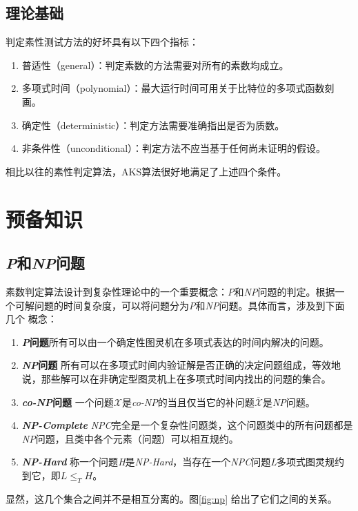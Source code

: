 \documentclass[a4paper]{article}
\numberwithin{equation}{section}
\begin{document}
\begin{multicols}{2}
  \subsection{理论基础}
  判定素性测试方法的好坏具有以下四个指标：
  \begin{enumerate}
  \item 普适性（general）：判定素数的方法需要对所有的素数均成立。
  \item 多项式时间（polynomial）：最大运行时间可用关于比特位的多项式函数刻画。
  \item 确定性（deterministic）：判定方法需要准确指出是否为质数。
  \item 非条件性（unconditional）：判定方法不应当基于任何尚未证明的假设。
  \end{enumerate}

  相比以往的素性判定算法，AKS算法很好地满足了上述四个条件。

  \section{预备知识}
  \subsection{\textit{P}和\textit{NP}问题}
  素数判定算法设计到复杂性理论中的一个重要概念：\textit{P}和\textit{NP}问题的判定。根据一个可解问题的时间复杂度，可以将问题分为\textit{P}和\textit{NP}问题。具体而言，涉及到下面几个
  概念：
  \begin{enumerate}
  \item \textbf{\textit{P}问题}\quad 所有可以由一个确定性图灵机在多项式表达的时间内解决的问题。
  \item \textbf{\textit{NP}问题}\quad
    所有可以在多项式时间内验证解是否正确的决定问题组成，等效地说，那些解可以在非确定型图灵机上在多项式时间内找出的问题的集合。
  \item \textbf{\textit{co-NP}问题}\quad
    一个问题$\mathcal{X}$是\textit{co-NP}的当且仅当它的补问题$\overline{\mathcal{X}}$是\textit{NP}问题。
  \item \textbf{\textit{NP-Complete}}\quad
    \textit{NPC}完全是一个复杂性问题类，这个问题类中的所有问题都是\textit{NP}问题，且类中各个元素（问题）可以相互规约。
  \item \textbf{\textit{NP-Hard}}\quad
    称一个问题\textit{H}是\textit{NP-Hard}，当存在一个\textit{NPC}问题\textit{L}多项式图灵规约到它，即$L\le _T H$。
  \end{enumerate}

  显然，这几个集合之间并不是相互分离的。图\ref{fig:np} 给出了它们之间的关系。


\end{multicols}
\end{document}
